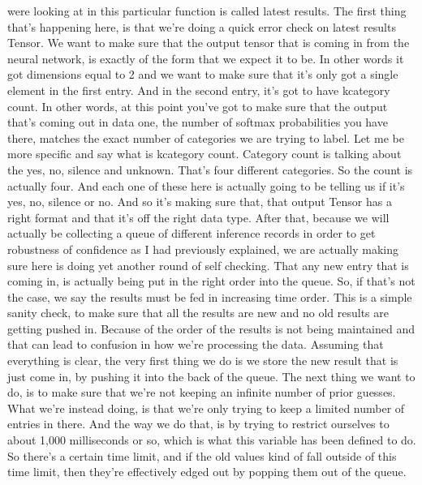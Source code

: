     were looking at in this particular function is called latest results.
    The first thing that's happening here, is
    that we're doing a quick error check on latest results Tensor.
    We want to make sure that the output tensor that
    is coming in from the neural network, is exactly of the form
    that we expect it to be.
    In other words it got dimensions equal to 2
    and we want to make sure that it's only got
    a single element in the first entry.
    And in the second entry, it's got to have kcategory count.
    In other words, at this point you've got to make sure
    that the output that's coming out in data one,
    the number of softmax probabilities you have there,
    matches the exact number of categories we are trying to label.
    Let me be more specific and say what is kcategory count.
    Category count is talking about the yes, no, silence and unknown.
    That's four different categories.
    So the count is actually four.
    And each one of these here is actually going
    to be telling us if it's yes, no, silence or no.
    And so it's making sure that, that output Tensor has a right format
    and that it's off the right data type.
    After that, because we will actually be collecting
    a queue of different inference records in order
    to get robustness of confidence as I had previously explained,
    we are actually making sure here is doing yet
    another round of self checking.
    That any new entry that is coming in, is actually being put in the right order
    into the queue.
    So, if that's not the case, we say the results
    must be fed in increasing time order.
    This is a simple sanity check, to make sure that all the results are new
    and no old results are getting pushed in.
    Because of the order of the results is not being maintained
    and that can lead to confusion in how we're processing the data.
    Assuming that everything is clear, the very first thing we do
    is we store the new result that is just come in, by pushing it
    into the back of the queue.
    The next thing we want to do, is to make sure
    that we're not keeping an infinite number of prior guesses.
    What we're instead doing, is that we're only
    trying to keep a limited number of entries in there.
    And the way we do that, is by trying to restrict ourselves to about 1,000
    milliseconds or so, which is what this variable has been defined to do.
    So there's a certain time limit, and if the old values
    kind of fall outside of this time limit, then they're
    effectively edged out by popping them out of the queue.
